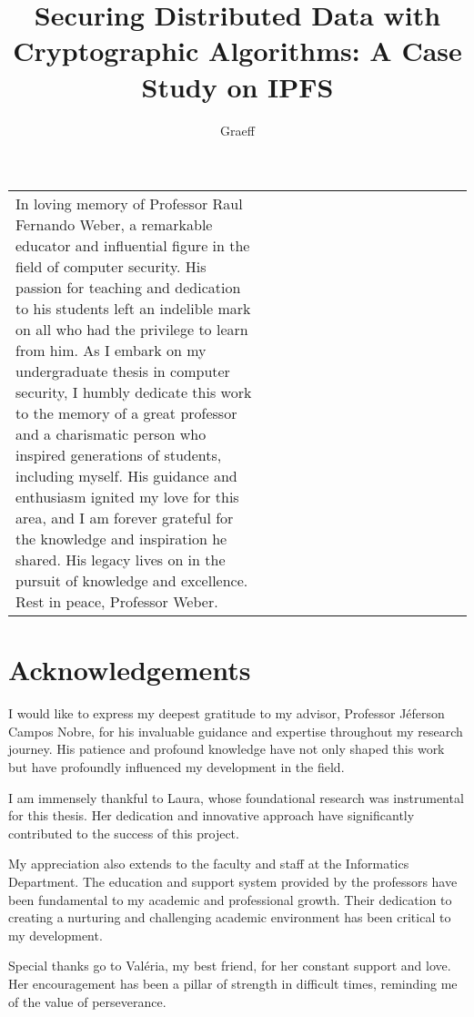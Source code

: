 \documentclass[cic,tc,english]{iiufrgs}
\title{
    Securing Distributed Data with Cryptographic Algorithms: A Case Study on 
    IPFS
}
\author{Graeff}{Felipe de Almeida}
\begin{document}
\maketitle

\clearpage
\begin{flushright}
    \mbox{}\vfill
    \begin{tabular}{p{0.55\linewidth} p{0.45\linewidth}}
        In loving memory of Professor Raul Fernando Weber, a remarkable educator
        and influential figure in the field of computer security. His passion
        for teaching and dedication to his students left an indelible mark on
        all who had the privilege to learn from him. As I embark on my
        undergraduate thesis in computer security, I humbly dedicate this work
        to the memory of a great professor and a charismatic person who inspired
        generations of students, including myself. His guidance and enthusiasm
        ignited my love for this area, and I am forever grateful for the
        knowledge and inspiration he shared. His legacy lives on in the pursuit
        of knowledge and excellence. Rest in peace, Professor Weber.\\
    \end{tabular}
\end{flushright}

\chapter*{Acknowledgements}
    I would like to express my deepest gratitude to my advisor, Professor 
    Jéferson Campos Nobre, for his invaluable guidance and expertise throughout 
    my research journey. His patience and profound knowledge have not only 
    shaped this work but have profoundly influenced my development in the field.

    I am immensely thankful to Laura, whose foundational research was 
    instrumental for this thesis. Her dedication and innovative approach have 
    significantly contributed to the success of this project.

    My appreciation also extends to the faculty and staff at the Informatics 
    Department. The education and support system provided by the professors have
    been fundamental to my academic and professional growth. Their dedication to
    creating a nurturing and challenging academic environment has been critical 
    to my development.

    Special thanks go to Valéria, my best friend, for her constant support and 
    love. Her encouragement has been a pillar of strength in difficult times, 
    reminding me of the value of perseverance.
\end{document}
